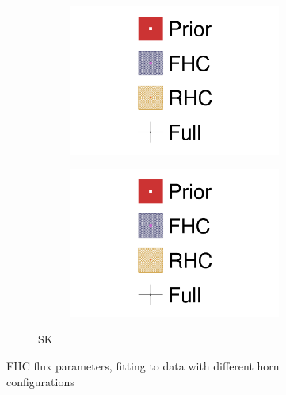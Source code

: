 \begin{figure}[h]
\begin{subfigure}[t]{\textwidth}
\begin{subfigure}[t]{0.24\textwidth}
			\includegraphics[width=\textwidth,page=12, trim={0mm 0mm 0mm 9mm}, clip]{figures/mach3/2018/data/2018a_FixedCov_RedCov_Mpi_NeuOnly_Data_merge_2018a_FixedCov_RedCov_Mpi_NeuBarOnly_Data_merge_2018a_FixedCov_RedCov_Mpi_Data_merge}
		\end{subfigure}
		\begin{subfigure}[t]{0.24\textwidth}
			\includegraphics[width=\textwidth,page=13, trim={0mm 0mm 0mm 9mm}, clip]{figures/mach3/2018/data/2018a_FixedCov_RedCov_Mpi_NeuOnly_Data_merge_2018a_FixedCov_RedCov_Mpi_NeuBarOnly_Data_merge_2018a_FixedCov_RedCov_Mpi_Data_merge}
		\end{subfigure}
		\caption{SK}
	\end{subfigure}
	\caption{FHC flux parameters, fitting to data with different horn configurations}
	\label{fig:data_fhcvsrhc_2018_fhc}
\end{figure}

